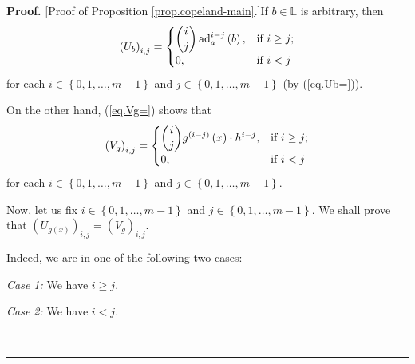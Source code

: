 \documentclass[numbers=enddot,12pt,final,onecolumn,notitlepage]{scrartcl}%
\theoremstyle{definition}
\newenvironment{proof}[1][Proof]{\noindent\textbf{#1.} }{\ \rule{0.5em}{0.5em}}
\begin{document}
\begin{proof}
[Proof of Proposition \ref{prop.copeland-main}.]If $b\in\mathbb{L}$ is
arbitrary, then%
\begin{equation}
\left(  U_{b}\right)  _{i,j}=%
\begin{cases}
\dbinom{i}{j}\operatorname*{ad}\nolimits_{a}^{i-j}\left(  b\right)  , &
\text{if }i\geq j;\\
0, & \text{if }i<j
\end{cases}
\label{pf.prop.copeland-main.Ubij=}%
\end{equation}
for each $i\in\left\{  0,1,\ldots,m-1\right\}  $ and $j\in\left\{
0,1,\ldots,m-1\right\}  $ (by (\ref{eq.Ub=})).

On the other hand, (\ref{eq.Vg=}) shows that%
\begin{equation}
\left(  V_{g}\right)  _{i,j}=%
\begin{cases}
\dbinom{i}{j}g^{\left(  i-j\right)  }\left(  x\right)  \cdot h^{i-j}, &
\text{if }i\geq j;\\
0, & \text{if }i<j
\end{cases}
\label{pf.prop.copeland-main.Vgij=}%
\end{equation}
for each $i\in\left\{  0,1,\ldots,m-1\right\}  $ and $j\in\left\{
0,1,\ldots,m-1\right\}  $.

Now, let us fix $i\in\left\{  0,1,\ldots,m-1\right\}  $ and $j\in\left\{
0,1,\ldots,m-1\right\}  $. We shall prove that $\left(  U_{g\left(  x\right)
}\right)  _{i,j}=\left(  V_{g}\right)  _{i,j}$.

Indeed, we are in one of the following two cases:

\textit{Case 1:} We have $i\geq j$.

\textit{Case 2:} We have $i<j$.


\end{proof}
\end{document}

